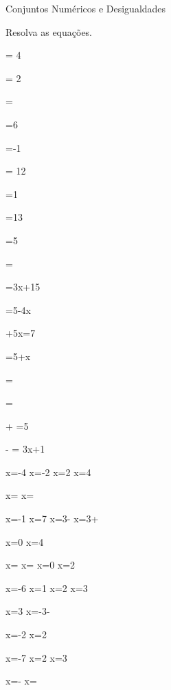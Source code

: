 \begin{exercicios}{Conjuntos Numéricos e Desigualdades}
    \begin{exercicio} %
        Resolva as equações.
        \begin{mathlist}[2]
            \item {} = 4
            \item {} = 2
            \item {} = 
            \item {} =6
            \item {} =-1
            \item {} = 12
            \item {} =1
            \item {} =13
            \item {} =5
            \item {} =
            \item {} =3x+15
            \item {} =5-4x
            \item {} +5x=7
            \item {} =5+x
            \item {} =
            \item {} = 
            \item {} +  =5
            \item {} -  = 3x+1
        \end{mathlist}
        \begin{answers}
            \begin{mathlist}[2]
                \item x=-4  x=-2  x=2  x=4
                \item x=  x=
                \item x=-1  x=7  x=3-  x=3+
                \item x=0  x=4
                \item x=  x=  x=0  x=2
                \item x=-6  x=1  x=2  x=3
                \item x=3  x=-3-
                \item x=-2  x=2
                \item x=-7  x=2  x=3
                \item x=-  x=
            \end{mathlist}
        \end{answers}
    \end{exercicio}


\end{exercicios}
